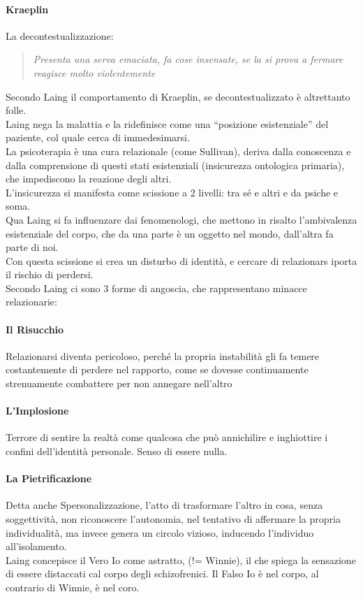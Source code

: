 \documentclass[12pt, a4paper]{article}
\begin{document}
\paragraph{Kraeplin}  La decontestualizzazione:
\begin{quote}
    \emph{Presenta una serva emaciata, fa cose insensate, se la si prova a fermare reagisce molto violentemente}
\end{quote}
Secondo Laing il comportamento di Kraeplin, se decontestualizzato è altrettanto folle.
\medskip\\ 
Laing nega la malattia e la ridefinisce come una ``posizione esistenziale'' del paziente, col quale cerca di immedesimarsi.
\medskip\\ 
La psicoterapia è una cura relazionale (come Sullivan), deriva dalla conoscen\-za e dalla comprensione di questi stati esistenziali (insicurezza ontologica primaria), che impediscono la reazione degli altri.
\medskip\\ 
L'insicurezza si manifesta come scissione a 2 livelli: tra sé e altri e da psiche e soma. \\
Qua Laing si fa influenzare dai fenomenologi, che mettono in risalto l'ambi\-va\-le\-nza esistenziale del corpo, che da una parte è un oggetto nel mondo, dall'altra fa parte di noi. \\
Con questa scissione si crea un disturbo di identità, e cercare di relazionars iporta il rischio di perdersi.
\medskip\\ 
Secondo Laing ci sono 3 forme di angoscia, che rappresentano minacce relazionarie:
\paragraph{Il Risucchio} Relazionarsi diventa pericoloso, perché la propria instabilità gli fa temere costantemente di perdere nel rapporto, come se dovesse continuamente strenuamente combattere per non annegare nell'altro
\paragraph{L'Implosione} Terrore di sentire la realtà come qualcosa che può annichilire e inghiottire i confini dell'identità personale. Senso di essere nulla.
\paragraph{La Pietrificazione} Detta anche Spersonalizzazione, l'atto di trasformare l'alt\-ro in cosa, senza soggettività, non riconoscere l'autonomia, nel tentativo di affermare la propria individualità, ma invece genera un circolo vizioso, inducendo l'individuo all'isolamento.
\medskip\\
Laing concepisce il Vero Io come astratto, (!= Winnie), il che spiega la sensazione di essere distaccati cal corpo degli schizofrenici.
Il Falso Io è nel corpo, al contrario di Winnie, è nel coro.
\end{document}
